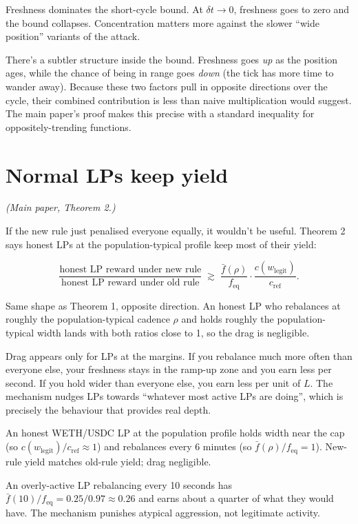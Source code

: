 \documentclass[11pt,a4paper]{article}
\begin{document}
\begin{intuition}
Freshness dominates the short-cycle bound. At $\delta t \to 0$, freshness goes to zero and the bound collapses. Concentration matters more against the slower ``wide position'' variants of the attack.

There's a subtler structure inside the bound. Freshness goes \emph{up} as the position ages, while the chance of being in range goes \emph{down} (the tick has more time to wander away). Because these two factors pull in opposite directions over the cycle, their combined contribution is less than naive multiplication would suggest. The main paper's proof makes this precise with a standard inequality for oppositely-trending functions.
\end{intuition}

\section{Normal LPs keep yield}

\emph{(Main paper, Theorem 2.)}

If the new rule just penalised everyone equally, it wouldn't be useful. Theorem 2 says honest LPs at the population-typical profile keep most of their yield:

\begin{result}
\[
\frac{\text{honest LP reward under new rule}}{\text{honest LP reward under old rule}} \;\gtrsim\; \frac{\bar f(\rho)}{f_{\text{eq}}} \cdot \frac{c(w_{\text{legit}})}{c_{\text{ref}}}.
\]
\end{result}

Same shape as Theorem 1, opposite direction. An honest LP who rebalances at roughly the population-typical cadence $\rho$ and holds roughly the population-typical width lands with both ratios close to 1, so the drag is negligible.

\begin{intuition}
Drag appears only for LPs at the margins. If you rebalance much more often than everyone else, your freshness stays in the ramp-up zone and you earn less per second. If you hold wider than everyone else, you earn less per unit of $L$. The mechanism nudges LPs towards ``whatever most active LPs are doing'', which is precisely the behaviour that provides real depth.
\end{intuition}

\begin{example}
An honest WETH/USDC LP at the population profile holds width near the cap (so $c(w_{\text{legit}})/c_{\text{ref}} \approx 1$) and rebalances every 6 minutes (so $\bar f(\rho)/f_{\text{eq}} = 1$). New-rule yield matches old-rule yield; drag negligible.

An overly-active LP rebalancing every 10 seconds has $\bar f(10)/f_{\text{eq}} = 0.25/0.97 \approx 0.26$ and earns about a quarter of what they would have. The mechanism punishes atypical aggression, not legitimate activity.
\end{example}
\end{document}
